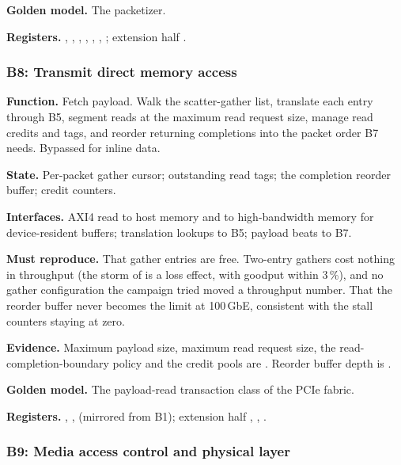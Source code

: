 \textbf{Golden model.} The packetizer.

{\raggedright
\textbf{Registers.} , ,
, , ,
, ; extension half
.\par}

\subsubsection{B8: Transmit direct memory access}

\textbf{Function.} Fetch payload. Walk the scatter-gather list, translate each
entry through B5, segment reads at the maximum read request size, manage read
credits and tags, and reorder returning completions into the packet order B7
needs. Bypassed for inline data.

\textbf{State.} Per-packet gather cursor; outstanding read tags; the completion
reorder buffer; credit counters.

\textbf{Interfaces.} AXI4 read to host memory and to high-bandwidth memory for
device-resident buffers; translation lookups to B5; payload beats to B7.

\textbf{Must reproduce.} That gather entries are free. Two-entry gathers cost
nothing in throughput (the storm of  is a loss effect, with goodput
within 3\,\%), and no gather configuration the campaign tried moved a
throughput number. That the reorder buffer never becomes the limit at
100\,GbE, consistent with the stall counters staying at zero.

\textbf{Evidence.} Maximum payload size, maximum read request size, the
read-completion-boundary policy and the credit pools are \evdoc{}. Reorder
buffer depth is \evcal{}.

\textbf{Golden model.} The payload-read transaction class of the PCIe fabric.

{\raggedright
\textbf{Registers.} , ,
 (mirrored from B1); extension half
, , .\par}

\subsubsection{B9: Media access control and physical layer}


